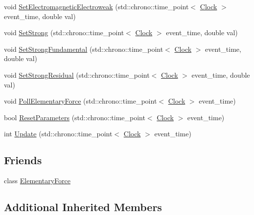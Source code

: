 \begin{DoxyCompactItemize}
\item 
void \hyperlink{class_elementary_force_af4f12038c33d7edf9f13339fcd632ec9}{Set\+Electromagnetic\+Electroweak} (std\+::chrono\+::time\+\_\+point$<$ \hyperlink{universe_8h_a0ef8d951d1ca5ab3cfaf7ab4c7a6fd80}{Clock} $>$ event\+\_\+time, double val)
\item 
void \hyperlink{class_elementary_force_aa1b5708cfab2069049fec5c924e1f246}{Set\+Strong} (std\+::chrono\+::time\+\_\+point$<$ \hyperlink{universe_8h_a0ef8d951d1ca5ab3cfaf7ab4c7a6fd80}{Clock} $>$ event\+\_\+time, double val)
\item 
void \hyperlink{class_elementary_force_afb00e9a10ec33eeb1daefce39b0468b7}{Set\+Strong\+Fundamental} (std\+::chrono\+::time\+\_\+point$<$ \hyperlink{universe_8h_a0ef8d951d1ca5ab3cfaf7ab4c7a6fd80}{Clock} $>$ event\+\_\+time, double val)
\item 
void \hyperlink{class_elementary_force_ac25021d38c1d54bf711096ab37a461f6}{Set\+Strong\+Residual} (std\+::chrono\+::time\+\_\+point$<$ \hyperlink{universe_8h_a0ef8d951d1ca5ab3cfaf7ab4c7a6fd80}{Clock} $>$ event\+\_\+time, double val)
\item 
void \hyperlink{class_elementary_force_aa5ab479744dbf3e8578f8d2974299ff7}{Poll\+Elementary\+Force} (std\+::chrono\+::time\+\_\+point$<$ \hyperlink{universe_8h_a0ef8d951d1ca5ab3cfaf7ab4c7a6fd80}{Clock} $>$ event\+\_\+time)
\item 
bool \hyperlink{class_elementary_force_a1dedcd23a538b87f71ecd43cb36a6db5}{Reset\+Parameters} (std\+::chrono\+::time\+\_\+point$<$ \hyperlink{universe_8h_a0ef8d951d1ca5ab3cfaf7ab4c7a6fd80}{Clock} $>$ event\+\_\+time)
\item 
int \hyperlink{class_elementary_force_a855c26eb8a542ff633af66940da5f90b}{Update} (std\+::chrono\+::time\+\_\+point$<$ \hyperlink{universe_8h_a0ef8d951d1ca5ab3cfaf7ab4c7a6fd80}{Clock} $>$ event\+\_\+time)
\end{DoxyCompactItemize}
\subsection*{Friends}
\begin{DoxyCompactItemize}
\item 
class \hyperlink{class_elementary_force_a6e57500586e9cd366f5cf76ea0299957}{Elementary\+Force}
\end{DoxyCompactItemize}
\subsection*{Additional Inherited Members}


